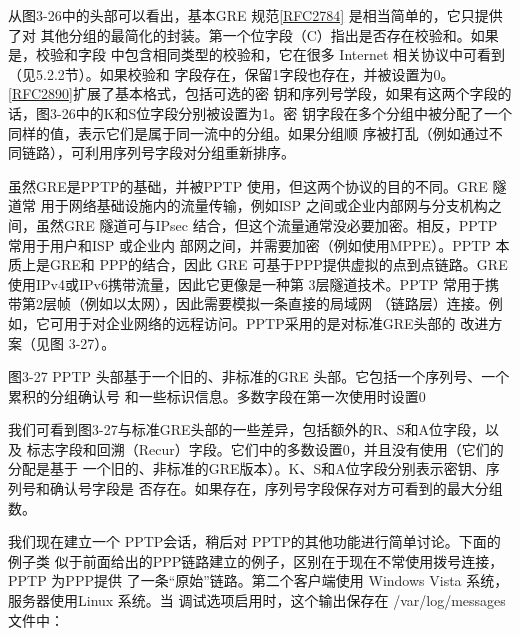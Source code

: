从图3-26中的头部可以看出，基本GRE
规范\href{https://www.rfc-editor.org/rfc/rfc2784}{[RFC2784]} 是相当简单的，它只提供了对
其他分组的最简化的封装。第一个位字段（C）指出是否存在校验和。如果是，校验和字段
中包含相同类型的校验和，它在很多 Internet 相关协议中可看到（见5.2.2节）。如果校验和
字段存在，保留1字段也存在，并被设置为0。\href{https://www.rfc-editor.org/rfc/rfc2890}{[RFC2890]}扩展了基本格式，包括可选的密
钥和序列号学段，如果有这两个字段的话，图3-26中的K和S位字段分别被设置为1。密
钥字段在多个分组中被分配了一个同样的值，表示它们是属于同一流中的分组。如果分组顺
序被打乱（例如通过不同链路），可利用序列号字段对分组重新排序。

虽然GRE是PPTP的基础，并被PPTP 使用，但这两个协议的目的不同。GRE 隧道常
用于网络基础设施内的流量传输，例如ISP 之间或企业内部网与分支机构之间，虽然GRE
隧道可与IPsec 结合，但这个流量通常没必要加密。相反，PPTP 常用于用户和ISP 或企业内
部网之间，并需要加密（例如使用MPPE）。PPTP 本质上是GRE和 PPP的结合，因此 GRE
可基于PPP提供虚拟的点到点链路。GRE使用IPv4或IPv6携带流量，因此它更像是一种第
3层隧道技术。PPTP 常用于携带第2层帧（例如以太网），因此需要模拟一条直接的局域网
（链路层）连接。例如，它可用于对企业网络的远程访问。PPTP采用的是对标准GRE头部的
改进方案（见图 3-27）。

图3-27 PPTP 头部基于一个旧的、非标准的GRE 头部。它包括一个序列号、一个累积的分组确认号
和一些标识信息。多数字段在第一次使用时设置0

我们可看到图3-27与标准GRE头部的一些差异，包括额外的R、S和A位字段，以及
标志字段和回溯（Recur）字段。它们中的多数设置0，并且没有使用（它们的分配是基于
一个旧的、非标准的GRE版本）。K、S和A位字段分别表示密钥、序列号和确认号字段是
否存在。如果存在，序列号字段保存对方可看到的最大分组数。

我们现在建立一个 PPTP会话，稍后对 PPTP的其他功能进行简单讨论。下面的例子类
似于前面给出的PPP链路建立的例子，区别在于现在不常使用拨号连接，PPTP 为PPP提供
了一条“原始”链路。第二个客户端使用 Windows Vista 系统，服务器使用Linux 系统。当
调试选项启用时，这个输出保存在 /var/log/messages 文件中：

